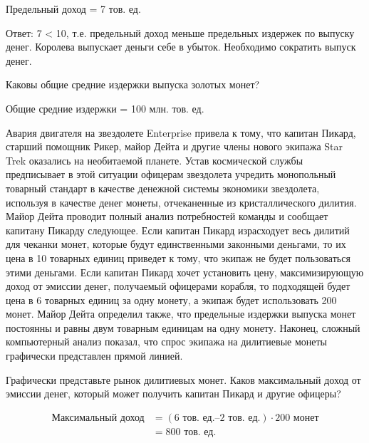 \documentclass[12pt, table, a4paper,twoside]{exam}
\begin{document}
\begin{questions}
\begin{subparts}
\begin{solution}[12em]
	Предельный доход = 7 тов. ед. 
	
	Ответ: 7 < 10, т.е. предельный доход меньше предельных издержек по выпуску денег. Королева выпускает деньги себе в убыток. Необходимо сократить выпуск денег.
		
	\end{solution}
	
	\subpart[5] Каковы общие средние издержки выпуска золотых монет?
	\begin{solution}[12em]
		
	Общие средние издержки = 100 млн. тов. ед.
	
	\end{solution}
	
\end{subparts}
\addpoints

\question[15] Авария двигателя на звездолете Enterprise привела к тому, что капитан Пикард, старший помощник Рикер, майор Дейта и другие члены нового экипажа Star Trek оказались на необитаемой планете. Устав космической службы предписывает в этой ситуации офицерам звездолета учредить монопольный товарный стандарт в качестве денежной системы экономики звездолета, используя в качестве денег монеты, отчеканенные из кристаллического дилития. Майор Дейта проводит полный анализ потребностей команды и сообщает капитану Пикарду следующее. Если капитан Пикард израсходует весь дилитий для чеканки монет, которые будут единственными законными деньгами, то их цена в 10 товарных единиц приведет к тому, что экипаж не будет пользоваться этими деньгами. Если капитан Пикард хочет установить цену, максимизирующую доход от эмиссии денег, получаемый офицерами корабля, то подходящей будет цена в 6 товарных единиц за одну монету, а экипаж будет использовать 200 монет. Майор Дейта определил также, что предельные издержки выпуска монет постоянны и равны двум товарным единицам на одну монету. Наконец, сложный компьютерный анализ показал, что спрос экипажа на дилитиевые монеты графически представлен прямой линией. 
\noaddpoints

\begin{subparts}
	\subpart[5] Графически представьте рынок дилитиевых монет. Каков максимальный доход от эмиссии денег, который может получить капитан Пикард и другие офицеры?
		
	\begin{solution}[12em]
	\begin{align*}
	\text{Максимальный доход} &= (6\text{ тов. ед.} – 2 \text{ тов. ед.}) \cdot 200 \text{ монет} \\
	&= 800 \text{ тов. ед.}
	\end{align*}
		

\end{solution}
\end{subparts}
\end{questions}
\end{document}
